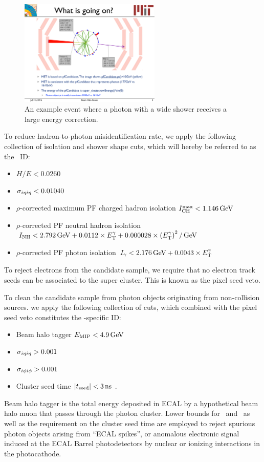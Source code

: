 \begin{figure}[htbp]
  \begin{center}
    \includegraphics[width=0.6\textwidth]{Reconstruction/Figures/badcorr_evtdisp.pdf}
    \caption{
      An example event where a photon with a wide shower receives a large energy correction.
    }
    \label{fig:badcorr_evtdisp}
  \end{center}
\end{figure}

To reduce hadron-to-photon misidentification rate, we apply the following collection of isolation and shower shape cuts, which will hereby be referred to as the \egamma\ ID:
\begin{itemize}
  \item $H/E < 0.0260$
  \item $\sigma_{i\eta i\eta} < 0.01040$
  \item $\rho$-corrected maximum PF charged hadron isolation $I_{\text{CH}}^{\text{max}} < 1.146\,\text{Ge\hspace{-.08em}V}$
  \item $\rho$-corrected PF neutral hadron isolation $I_{\text{NH}} < 2.792\,\text{Ge\hspace{-.08em}V} + 0.0112 \times E_{\mathrm{T}}^{\gamma} + 0.000028 \times \left(E_{\mathrm{T}}^{\gamma} \right)^2/\,\text{Ge\hspace{-.08em}V}$
  \item $\rho$-corrected PF photon isolation $I_{\gamma} < 2.176\,\text{Ge\hspace{-.08em}V} + 0.0043 \times E_{\mathrm{T}}^{\gamma}$
\end{itemize}

To reject electrons from the candidate sample, we require that no electron track seeds can be associated to the super cluster. This is known as the pixel seed veto.

To clean the candidate sample from photon objects originating from non-collision sources. we apply the following collection of cuts, which combined with the pixel seed veto constitutes the \Pgg-specific ID:
\begin{itemize} 
  \item Beam halo tagger $E_{\mathrm{MIP}} < 4.9\,\text{Ge\hspace{-.08em}V}$
  \item $\sigma_{i\eta i\eta} > 0.001$
  \item $\sigma_{i\phi i\phi} > 0.001$
  \item Cluster seed time $\lvert t_{\mathrm{seed}} \rvert < 3\, \text{ns}$ .
\end{itemize}
Beam halo tagger is the total energy deposited in ECAL by a hypothetical beam halo muon that passes through the photon cluster. 
Lower bounds for \sieie\ and \sipip\ as well as the requirement on the cluster seed time are employed to reject spurious photon objects arising from ``ECAL spikes'', or anomalous electronic signal induced at the ECAL Barrel photodetectors by nuclear or ionizing interactions in the photocathode.

